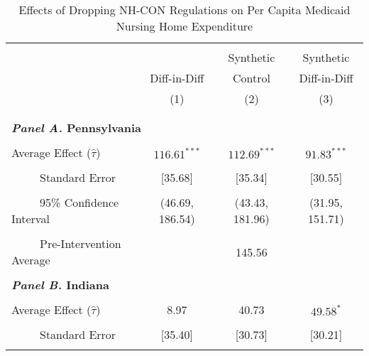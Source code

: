 \documentclass[../Main.tex]{subfiles}
\begin{document}
\newpage
\null
\vfill
\begin{table}[htbp]\centering \footnotesize
\def\sym#1{\ifmmode^{#1}\else\(^{#1}\)\fi}
\captionsetup{width=.8\textwidth}
\caption{\centering Effects of Dropping NH-CON Regulations on Per Capita Medicaid Nursing Home Expenditure}
\label{tab:ave_results_med_exp}
\setlength{\tabcolsep}{10pt}
\begin{tabular}{l*{3}{c}}
\hline\hline
\\[-2ex]
&\multicolumn{1}{c}{}&\multicolumn{1}{c}{Synthetic}&\multicolumn{1}{c}{Synthetic}\\
&\multicolumn{1}{c}{Diff-in-Diff}&\multicolumn{1}{c}{Control}&\multicolumn{1}{c}{Diff-in-Diff}\\
&\multicolumn{1}{c}{(1)}&\multicolumn{1}{c}{(2)}&\multicolumn{1}{c}{(3)}\\
\\[-2ex]
\hline
\\[-.1ex]
\multicolumn{4}{l}{\textbf{\textit{Panel A.} Pennsylvania}}\\
\\[-1.5ex]
\multicolumn{1}{l}{Average Effect ($\hat{\tau}$)}&   \multicolumn{1}{c}{$116.61^{***}$}&   \multicolumn{1}{c}{$112.69^{***}$}&  \multicolumn{1}{c}{$91.83^{***}$}\\
\\[-2ex]
\multicolumn{1}{l}{\ \ \ \ \ Standard Error}  &\multicolumn{1}{c}{[35.68]}&\multicolumn{1}{c}{[35.34]}&\multicolumn{1}{c}{[30.55]}\\
\\[-2ex]
\multicolumn{1}{l}{\ \ \ \ \ 95\% Confidence Interval}&   \multicolumn{1}{c}{(46.69, 186.54)}&   \multicolumn{1}{c}{(43.43, 181.96)}&   \multicolumn{1}{c}{(31.95, 151.71)}\\
\\[-2ex]
\multicolumn{1}{l}{\ \ \ \ \ Pre-Intervention Average}&   \multicolumn{3}{c}{145.56}\\
\\[-.1ex]
\multicolumn{4}{l}{\textbf{\textit{Panel B.} Indiana}}\\
\\[-1.5ex]
\multicolumn{1}{l}{Average Effect ($\hat{\tau}$)}&   \multicolumn{1}{c}{8.97}&   \multicolumn{1}{c}{40.73}&  \multicolumn{1}{c}{$49.58^{*}$}\\
\\[-2ex]
\multicolumn{1}{l}{\ \ \ \ \ Standard Error}  &\multicolumn{1}{c}{[35.40]}&\multicolumn{1}{c}{[30.73]}&\multicolumn{1}{c}{[30.21]}\\
\\[-2ex]

\end{tabular}
\end{table}
\end{document}
